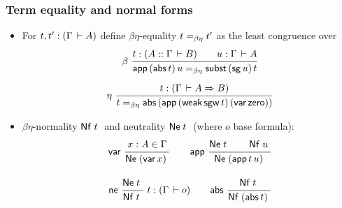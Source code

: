 \documentclass[t,fleqn,usenames,dvipsnames]{beamer}
\renewcommand{\Set}{\mathsf{Set}}
\begin{document}
\begin{frame}%
  \frametitle{Term equality and normal forms}
  \vspace{-3ex}
  \begin{itemize}
  \item For $t,t' : (\Gamma \,\vdash A)$ define $\beta\eta$-equality
    $t =_{\beta\eta} t'$ as the least congruence over
  \begin{multline*}
  \nru{\beta
     }{t : (A :: \Gamma \der B) \qquad u : \Gamma \der A
     }{\tapp\,(\tabs\,t)\,u \beeq \tsubst\,(\tsg\,u)\,t}
\\[1ex]
  \nru{\eta
     }{t : (\Gamma \der A \To B)
     }{t \beeq \tabs\,(\tapp\,(\tweak\,\tsgw\,t)\,(\tvar\,\tzero))}
  \end{multline*}
  \item $\beta\eta$-normality $\Nf t$ and neutrality $\Ne t$
   (where $o$ base formula):
    \begin{gather*}
      \nru{\tvar}{x : A \in \Gamma}{\Ne{(\tvar\, x)}}
\qquad
      \nru{\tapp}{\Ne t \qquad \Nf u}{\Ne{(\tapp\,t\,u)}}
\\[2ex]
  \nrux{\tne}{\Ne t}{\Nf t}{t : (\Gamma \der o)}
\qquad
  \nru{\tabs}{\Nf t}{\Nf{(\tabs\,t)}}
    \end{gather*}
  \end{itemize}
\end{frame}

\renewcommand{\NF}{\mathsf{NF}}
\renewcommand{\NE}{\mathsf{NE}}

\newcommand{\tsound}{\mathsf{sound}}
\newcommand{\tcomplete}{\mathsf{complete}}
\end{document}

